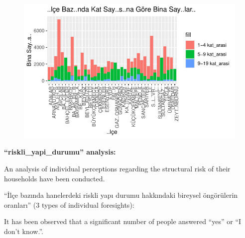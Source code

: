 \documentclass[
  11pt,
  a4paper,
  DIV=11,
  numbers=noendperiod]{scrartcl}
\newenvironment{Shaded}{\begin{snugshade}}{\end{snugshade}}
\newcommand{\AttributeTok}[1]{\textcolor[rgb]{0.40,0.45,0.13}{#1}}
\newcommand{\FunctionTok}[1]{\textcolor[rgb]{0.28,0.35,0.67}{#1}}
\newcommand{\NormalTok}[1]{\textcolor[rgb]{0.00,0.23,0.31}{#1}}
\newcommand{\OtherTok}[1]{\textcolor[rgb]{0.00,0.23,0.31}{#1}}
\newcommand{\SpecialCharTok}[1]{\textcolor[rgb]{0.37,0.37,0.37}{#1}}
\begin{document}
\begin{figure}[H]

{\centering \includegraphics{project_files/figure-pdf/unnamed-chunk-10-1.pdf}

}

\end{figure}

\textbf{``riskli\_yapi\_durumu'' analysis:}

An analysis of individual perceptions regarding the structural risk of
their households have been conducted.

``İlçe bazında hanelerdeki riskli yapı durumu hakkındaki bireysel
öngörülerin oranları'' (3 types of individual foresights):

It has been observed that a significant number of people answered
``yes'' or ``I don't know.''.

\begin{Shaded}
\end{Shaded}
\end{document}
